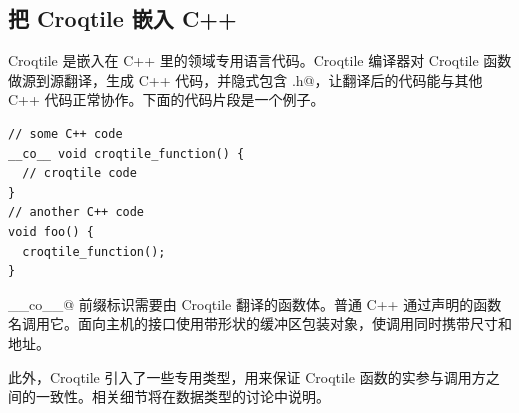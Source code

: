 \subsection*{把 Croqtile 嵌入 C++}

Croqtile 是嵌入在 C++ 里的领域专用语言代码。Croqtile 编译器对 Croqtile 函数做源到源翻译，生成 C++ 代码，并隐式包含 \co@choreo.h@，让翻译后的代码能与其他 C++ 代码正常协作。下面的代码片段是一个例子。

\begin{lstlisting}[language=croqtile,caption={在 C++ 中嵌入 Croqtile}]
// some C++ code
__co__ void croqtile_function() {
  // croqtile code
}
// another C++ code
void foo() {
  croqtile_function();
}
\end{lstlisting}

\co@__co__@ 前缀标识需要由 Croqtile 翻译的函数体。普通 C++ 通过声明的函数名调用它。面向主机的接口使用带形状的缓冲区包装对象，使调用同时携带尺寸和地址。

此外，Croqtile 引入了一些专用类型，用来保证 Croqtile 函数的实参与调用方之间的一致性。相关细节将在数据类型的讨论中说明。
